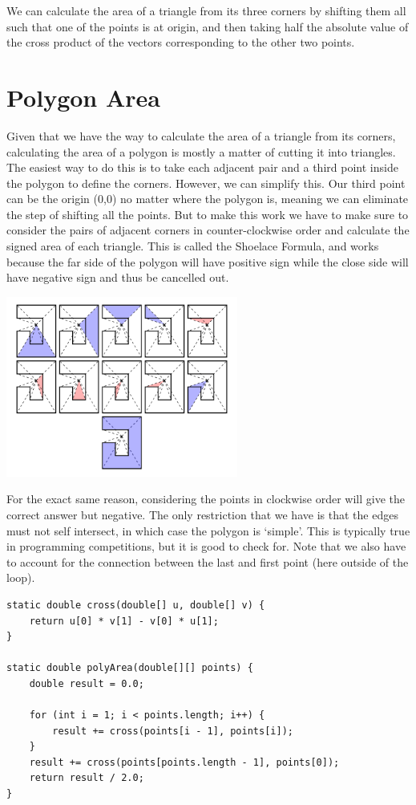 \documentclass[10pt]{book}
\begin{document}
We can calculate the area of a triangle from its three corners by shifting them all such that one of the points is at origin, and then taking half the absolute value of the cross product of the vectors corresponding to the other two points.

\section {Polygon Area}

Given that we have the way to calculate the area of a triangle from its corners, calculating the area of a polygon is mostly a matter of cutting it into triangles. The easiest way to do this is to take each adjacent pair and a third point inside the polygon to define the corners. However, we can simplify this. Our third point can be the origin (0,0) no matter where the polygon is, meaning we can eliminate the step of shifting all the points. But to make this work we have to make sure to consider the pairs of adjacent corners in counter-clockwise order and calculate the signed area of each triangle. This is called the Shoelace Formula, and works because the far side of the polygon will have positive sign while the close side will have negative sign and thus be cancelled out. 

\begin{center}
\includegraphics[width=3in]{images/poly_area.png}
\end{center}

For the exact same reason, considering the points in clockwise order will give the correct answer but negative. The only restriction that we have is that the edges must not self intersect, in which case the polygon is `simple'. This is typically true in programming competitions, but it is good to check for. Note that we also have to account for the connection between the last and first point (here outside of the loop).

\begin{verbatim}
static double cross(double[] u, double[] v) {
    return u[0] * v[1] - v[0] * u[1];
}

static double polyArea(double[][] points) {
    double result = 0.0;

    for (int i = 1; i < points.length; i++) {
        result += cross(points[i - 1], points[i]);
    }
    result += cross(points[points.length - 1], points[0]);
    return result / 2.0;
}
\end{verbatim}
\end{document}
